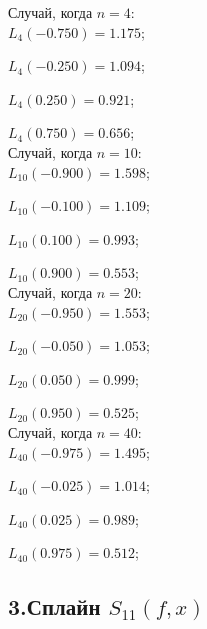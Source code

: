 \documentclass[11pt, russian]{article}
\begin{document}
    Случай, когда $n=4$:\\

    
    

    
    $L_{4}(-0.750)=1.175$;

    
    $L_{4}(-0.250)=1.094$;

    
    $L_{4}(0.250)=0.921$;

    
    $L_{4}(0.750)=0.656$;\\

    
    

    
    Случай, когда $n=10$:\\

    
    

    
    $L_{10}(-0.900)=1.598$;

    
    $L_{10}(-0.100)=1.109$;

    
    $L_{10}(0.100)=0.993$;

    
    $L_{10}(0.900)=0.553$;\\

    
    

    
    Случай, когда $n=20$:\\

    
    

    
    $L_{20}(-0.950)=1.553$;

    
    $L_{20}(-0.050)=1.053$;

    
    $L_{20}(0.050)=0.999$;

    
    $L_{20}(0.950)=0.525$;\\

    
    

    
    Случай, когда $n=40$:\\

    
    

    
    $L_{40}(-0.975)=1.495$;

    
    $L_{40}(-0.025)=1.014$;

    
    $L_{40}(0.025)=0.989$;

    
    $L_{40}(0.975)=0.512$;\\

    
    

    
    \hypertarget{ux441ux43fux43bux430ux439ux43d-s_11fx}{%
\subsection*{\texorpdfstring{3.Сплайн
\(S_{11}(f,x)\)}{3.Сплайн S\_\{11\}(f,x)}}\label{ux441ux43fux43bux430ux439ux43d-s_11fx}}
\end{document}
